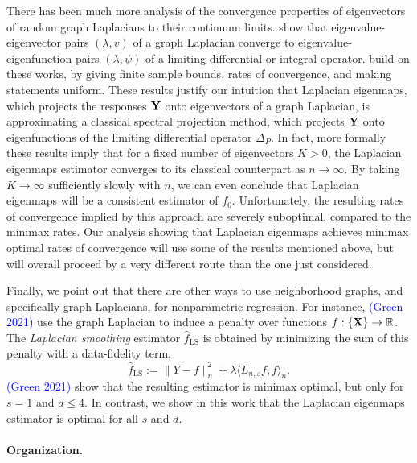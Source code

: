 \documentclass{article}
\newcommand{\Reals}{\mathbb{R}}
\newcommand{\1}{\mathbf{1}}
\newcommand{\dotp}[2]{\langle #1, #2 \rangle}
\newcommand{\wh}[1]{\widehat{#1}}
\theoremstyle{alden}
\theoremstyle{aldenthm}
\theoremstyle{definition}
\theoremstyle{remark}
\begin{document}
There has been much more analysis of the convergence properties of eigenvectors of random graph Laplacians to their continuum limits.  \citet{belkin07,vonluxburg2008,singer2017, garciatrillos18} show that eigenvalue-eigenvector pairs $(\lambda,v)$ of a graph Laplacian converge to eigenvalue-eigenfunction pairs $(\lambda,\psi)$ of a limiting differential or integral operator. \citet{burago2014, shi2015, trillos2019, calder2019, cheng2021} build on these works, by giving finite sample bounds, rates of convergence, and making statements uniform. These results justify our intuition that Laplacian eigenmaps, which projects the responses ${\bf Y}$ onto eigenvectors of a graph Laplacian, is approximating a classical spectral projection method, which projects ${\bf Y}$ onto eigenfunctions of the limiting differential operator $\Delta_P$. In fact, more formally these results imply that for a fixed number of eigenvectors $K > 0$, the Laplacian eigenmaps estimator converges to its classical counterpart as $n \to \infty$. By taking $K \to \infty$ sufficiently slowly with $n$, we can even conclude that Laplacian eigenmaps will be a consistent estimator of $f_0$. Unfortunately, the resulting rates of convergence implied by this approach are severely suboptimal, compared to the minimax rates. Our analysis showing that Laplacian eigenmaps achieves minimax optimal rates of convergence will use some of the results mentioned above, but will overall proceed by a very different route than the one just considered.

Finally, we point out that there are other ways to use neighborhood graphs, and specifically graph Laplacians, for nonparametric regression. For instance, \cite{trillos2020} \textcolor{blue}{(Green 2021)} use the graph Laplacian to induce a penalty over functions $f: \{\bf X\} \to \Reals$. The \emph{Laplacian smoothing} estimator $\wh{f}_{\mathrm{LS}}$ is obtained by minimizing the sum of this penalty with a data-fidelity term,
\begin{equation*}
\wh{f}_{\mathrm{LS}} := \|Y - f\|_n^2 + \lambda \dotp{L_{n,\varepsilon}f}{f}_n.
\end{equation*}
\textcolor{blue}{(Green 2021)} show that the resulting estimator is minimax optimal, but only for $s = 1$ and $d \leq 4$. In contrast, we show in this work that the Laplacian eigenmaps estimator is optimal for all $s$ and $d$.

\paragraph{Organization.}
\end{document}

